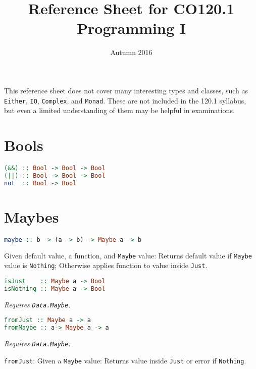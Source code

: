 \documentclass[twocolumn,english]{article}
\begin{document}
\title{Reference Sheet for CO120.1 Programming I}


\date{Autumn 2016}

\maketitle
This reference sheet does not cover many interesting types and classes,
such as \texttt{Either}, \texttt{IO}, \texttt{Complex}, and \texttt{Monad}.
These are not included in the 120.1 syllabus, but even a limited understanding
of them may be helpful in examinations.


\section{Bools}

\begin{lstlisting}[language=Haskell,frame=single]
(&&) :: Bool -> Bool -> Bool
(||) :: Bool -> Bool -> Bool
not  :: Bool -> Bool
\end{lstlisting}



\section{Maybes}

\begin{lstlisting}[language=Haskell,frame=single]
maybe :: b -> (a -> b) -> Maybe a -> b
\end{lstlisting}


Given default value, a function, and \texttt{Maybe} value: Returns
default value if \texttt{Maybe} value is \texttt{Nothing}; Otherwise
applies function to value inside \texttt{Just}.

\begin{lstlisting}[language=Haskell,frame=single]
isJust    :: Maybe a -> Bool
isNothing :: Maybe a -> Bool
\end{lstlisting}


\emph{Requires }\texttt{\emph{Data.Maybe}}\emph{.}

\begin{lstlisting}[language=Haskell,frame=single]
fromJust :: Maybe a -> a
fromMaybe :: a-> Maybe a -> a
\end{lstlisting}


\emph{Requires }\texttt{\emph{Data.Maybe}}\emph{. }

\texttt{fromJust}: Given a \texttt{Maybe} value: Returns value inside
\texttt{Just} or error if \texttt{Nothing}.
\end{document}
